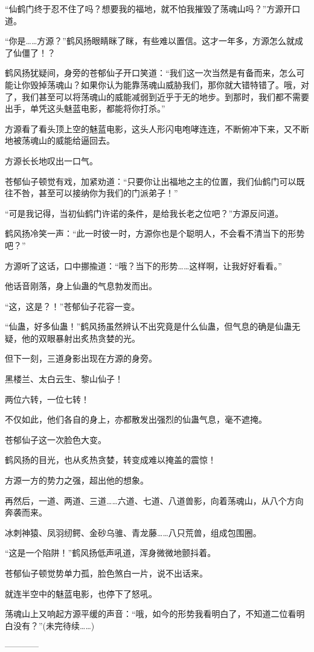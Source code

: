 \begin{this_body}
“仙鹤门终于忍不住了吗？想要我的福地，就不怕我摧毁了荡魂山吗？”方源开口道。

“你是……方源？”鹤风扬眼睛眯了眯，有些难以置信。这才一年多，方源怎么就成了仙僵了！？

鹤风扬犹疑间，身旁的苍郁仙子开口笑道：“我们这一次当然是有备而来，怎么可能让你毁掉荡魂山？如果你认为能靠荡魂山威胁我们，那你就大错特错了。哦，对了，我们甚至可以将荡魂山的威能减弱到近乎于无的地步。到那时，我们都不需要出手，单凭这头魅蓝电影，都能将你打杀。”

方源看了看头顶上空的魅蓝电影，这头人形闪电咆哮连连，不断俯冲下来，又不断地被荡魂山的威能给逼回去。

方源长长地叹出一口气。

苍郁仙子顿觉有戏，加紧劝道：“只要你让出福地之主的位置，我们仙鹤门可以既往不咎，甚至可以接纳你为我们的门派弟子！”

“可是我记得，当初仙鹤门许诺的条件，是给我长老之位吧？”方源反问道。

鹤风扬冷笑一声：“此一时彼一时，方源你也是个聪明人，不会看不清当下的形势吧？”

方源听了这话，口中挪揄道：“哦？当下的形势……这样啊，让我好好看看。”

他话音刚落，身上仙蛊的气息勃发而出。

“这，这是？！”苍郁仙子花容一变。

“仙蛊，好多仙蛊！”鹤风扬虽然辨认不出究竟是什么仙蛊，但气息的确是仙蛊无疑，他的双眼暴射出炙热贪婪的光。

但下一刻，三道身影出现在方源的身旁。

黑楼兰、太白云生、黎山仙子！

两位六转，一位七转！

不仅如此，他们各自的身上，亦都散发出强烈的仙蛊气息，毫不遮掩。

苍郁仙子这一次脸色大变。

鹤风扬的目光，也从炙热贪婪，转变成难以掩盖的震惊！

方源一方的势力之强，超出他的想象。

再然后，一道、两道、三道……六道、七道、八道兽影，向着荡魂山，从八个方向奔袭而来。

冰刺神猿、凤羽纫鳄、金砂乌骓、青龙藤……八只荒兽，组成包围圈。

“这是一个陷阱！”鹤风扬低声吼道，浑身微微地颤抖着。

苍郁仙子顿觉势单力孤，脸色煞白一片，说不出话来。

就连半空中的魅蓝电影，也停下了怒吼。

荡魂山上又响起方源平缓的声音：“哦，如今的形势我看明白了，不知道二位看明白没有？”(未完待续……)

------------

\end{this_body}

